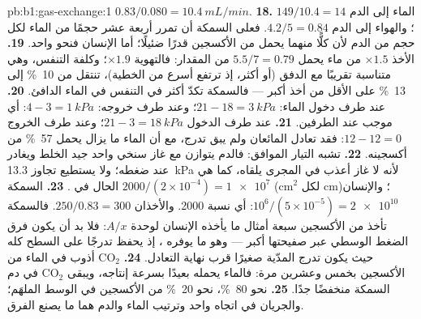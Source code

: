\begin{solution}{pb:b1:gas-exchange:1}
$0.83/0.080 = \qty{10.4}{mL/min}$.
\textbf{18.} الماء إلى الدم $149/10.4 = 14$؛ والهواء إلى الدم $4.2/5 = 0.84$.
فعلى السمكة أن تمرر أربعة عشر حجمًا من الماء لكل حجم من الدم لأن
كلًّا منهما يحمل من الأكسجين قدرًا ضئيلًا؛ أما الإنسان فنحو واحد.
\textbf{19.} الأخذ $\times 1.5$ من ماء يحمل $5.5/7 = 0.79$ من
المقدار: فالتهوية $\times 1.9$؛ وكلفة التنفس، وهي متناسبة تقريبًا
مع الدفق (أو أكثر، إذ ترتفع أسرع من الخطية)، تنتقل من \qty{10}{\%}
إلى \qty{13}{\%} على الأقل من أخذ أكبر --- فالسمكة تكدّ أكثر في
التنفس في الماء الدافئ.
\textbf{20.} عند طرف دخول الماء: $21 - 18 = \qty{3}{kPa}$؛ وعند طرف
خروجه: $4 - 3 = \qty{1}{kPa}$: أي موجب عند الطرفين.
\textbf{21.} عند طرف الدخول $21 - 3 = \qty{18}{kPa}$؛ وعند طرف الخروج $12 - 12 =
0$: فقد تعادل المائعان ولم يبق تدرج، مع أن الماء ما يزال يحمل
\qty{57}{\%} من أكسجينه.
\textbf{22.} تشبه التيار الموافق: فالدم يتوازن مع غاز سنخي واحد
جيد الخلط ويغادر عند ضغطه؛ ولا يستطيع تجاوز \qty{13.3}{kPa} لأنه
لا غاز أعذب في المجرى يلقاه، كما هي الحال في .
\textbf{23.} السمكة $2000/(2\times 10^{-4}) = \num{1e7}$ (cm$^2$ لكل cm)؛
والإنسان $10^6/(5\times 10^{-5}) = \num{2e10}$: أي نسبة \num{2000}. والأخذان
$250/0.83 = 300$. فالسمكة تأخذ من الأكسجين سبعة أمثال ما يأخذه
الإنسان لوحدة $A/x$: فلا بد أن يكون فرق الضغط الوسطي عبر صفيحتها
أكبر --- وهو ما يوفره ، إذ يحفظ تدرجًا على السطح كله
حيث يكون تدرج  المدّية صغيرًا قرب نهاية التعادل.
\textbf{24.} $\mathrm{CO_2}$ أذوب في الماء من الأكسجين بخمس وعشرين
مرة: فالماء يحمله بعيدًا بسرعة إنتاجه، ويبقى $\mathrm{CO_2}$ في دم
السمكة منخفضًا جدًا.
\textbf{25.}  نحو \qty{80}{\%}،  نحو \qty{20}{\%} من
الأكسجين في الوسط الملهَم؛ والجريان في اتجاه واحد وترتيب الماء
والدم  هما ما يصنع الفرق.
\end{solution}
